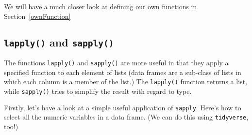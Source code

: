 \documentclass[titlepage]{book}\usepackage{knitr}
\begin{document}
\begin{knitrout}
\color{fgcolor}\begin{kframe}
\begin{alltt}
 \hlkwb{<-} \hlstd{=}  
 \hlkwb{<-}  \hlstd{(}\hlstd{,} \hlstd{)}     
\hlstd{\{}
\hlopt{^}
\hlstd{\}}

 \hlkwb{<-}  \hlstd{,}    \hlstd{=} \hlopt{/}\hlstd{)}
   
\end{alltt}
\end{kframe}
\end{knitrout}
We will have a much closer look at defining our own functions in Section~\ref{ownFunction} 


\subsection{\texttt{lapply()} and \texttt{sapply()}}

The functions \texttt{lapply()} and \texttt{sapply()} are more useful in that they apply a specified function to each element of lists (data frames are a sub-class of lists in which each column is a member of the list.) The  \texttt{lapply()} function returns a list, while \texttt{sapply()} tries to simplify the result with regard to type.


Firstly, let's have a look at a simple useful application of \texttt{sapply}. Here's how to select all the numeric variables in a data frame. (We can do this using \texttt{tidyverse}, too!)

\begin{knitrout}
\color{fgcolor}\begin{kframe}
\begin{alltt}
 \hlkwb{<-}     
 \hlkwb{<-} 
 \hlkwb{<-} 
 \hlkwb{<-} 
\end{alltt}
\end{kframe}
\end{knitrout}
\end{document}
